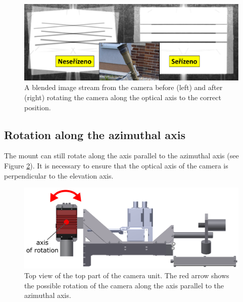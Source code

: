 \begin{figure}[htb]
	\centering
	\includegraphics[width=13cm]{fig/rect_mirrored_stream.png}
	\caption{A blended image stream from the camera before (left) and after (right) rotating the camera along the optical axis to the correct position.}
	\label{fig:rect_mirrored_stream}
\end{figure}

\subsection{Rotation along the azimuthal axis}

The mount can still rotate along the axis parallel to the azimuthal axis (see Figure \ref{fig:rect_model_top_view}). It is necessary to ensure that the optical axis of the camera is perpendicular to the elevation axis. 

\begin{figure}[htb]
	\centering
	\includegraphics[width=13cm]{fig/rect_model_top_view.png}
	\caption{Top view of the top part of the camera unit. The red arrow shows the possible rotation of the camera along the axis parallel to the azimuthal axis.}
	\label{fig:rect_model_top_view}
\end{figure}

